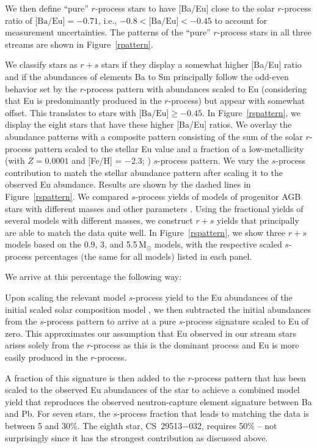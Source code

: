 \documentclass[twocolumn]{aastex63}
\begin{document}
We then define ``pure'' $r$-process stars to have [Ba/Eu] close to the solar $r$-process ratio of $\mbox{[Ba/Eu]}=-0.71$, i.e., $-0.8<\mbox{[Ba/Eu]}<-0.45$ to account for measurement uncertainties. The patterns of the ``pure'' $r$-process stars in all three streams are shown in Figure~\ref{rpattern}. 

We classify stars as $r+s$ stars if they display a somewhat higher [Ba/Eu] ratio and if the abundances of elements Ba to Sm principally follow the odd-even behavior set by the $r$-process pattern with abundances scaled to Eu (considering that Eu is predominantly produced in the $r$-process) but appear with somewhat offset. This translates to stars with $\mbox{[Ba/Eu]}\geq-0.45$.  In Figure~\ref{rspattern}, we display the eight stars that have these higher [Ba/Eu] ratios. We overlay the abundance patterns with a composite pattern consisting of the sum of the solar $r$-process pattern scaled to the stellar Eu value and a fraction of a low-metallicity (with $Z=0.0001$ and [Fe/H] = $-$2.3; \citealt{Lugaro12}) $s$-process pattern. We vary the $s$-process contribution to match the stellar abundance pattern after scaling it to the observed Eu abundance. Results are shown by the dashed lines in Figure~\ref{rspattern}. 
We compared $s$-process yields of models of progenitor AGB stars with different masses and other parameters \citep{Lugaro12}. Using the fractional yields of several models with different masses, we construct $r+s$ yields that principally are able to match the data quite well. In Figure~\ref{rspattern}, we show three $r+s$ models based on the 0.9, 3, and 5.5\,M$_{\odot}$ models, 
with the respective scaled $s$-process percentages (the same for all models) listed in each panel. 

We arrive at this percentage the following way: 

Upon scaling the relevant model $s$-process yield to the Eu abundances of the initial scaled solar composition model \citep{Lugaro12}, we then subtracted the initial abundances from the $s$-process pattern to arrive at a pure $s$-process signature scaled to Eu of zero. This approximates our assumption that Eu observed in our stream stars arises solely from the $r$-process as this is the dominant process and Eu is more easily produced in the $r$-process. 

A fraction of this signature is then added to the $r$-process pattern that has been scaled to the observed Eu abundances of the star to achieve a combined model yield that reproduces the observed neutron-capture element signature between Ba and Pb. For seven stars, the $s$-process fraction that leads to matching the data is between 5 and 30\%. The eighth star, CS~29513$-$032, requires 50\% -- not surprisingly since it has the strongest contribution as discussed above.
\end{document}
